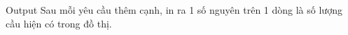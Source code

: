 Output
Sau mỗi yêu cầu thêm cạnh, in ra 1 số nguyên trên 1 dòng là số lượng cầu hiện có trong đồ thị.